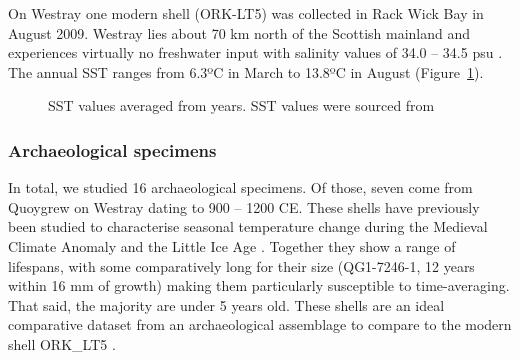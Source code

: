 \documentclass[
  authoryear,
  preprint,
  3p]{elsarticle}
\begin{document}
On Westray one modern shell (ORK-LT5) was collected in Rack Wick Bay in
August 2009. Westray lies about 70 km north of the Scottish mainland and
experiences virtually no freshwater input with salinity values of 34.0
-- 34.5 psu \citep{Inall2009-ho}. The annual SST ranges from 6.3ºC in
March to 13.8ºC in August (Figure~\ref{fig-SSTs}).

\begin{figure}


\caption{\label{fig-SSTs}SST values averaged from years. SST values were
sourced from \citet{Good2020-nl}}

\end{figure}%

\subsubsection{Archaeological specimens}\label{archaeological-specimens}

In total, we studied 16 archaeological specimens. Of those, seven come
from Quoygrew on Westray dating to 900 -- 1200 CE. These shells have
previously been studied to characterise seasonal temperature change
during the Medieval Climate Anomaly and the Little Ice Age
\citep{Surge2012-ba}. Together they show a range of lifespans, with some
comparatively long for their size (QG1-7246-1, 12 years within 16 mm of
growth) making them particularly susceptible to time-averaging. That
said, the majority are under 5 years old. These shells are an ideal
comparative dataset from an archaeological assemblage to compare to the
modern shell ORK\_LT5 \citep{Graniero2017-io}.
\end{document}

